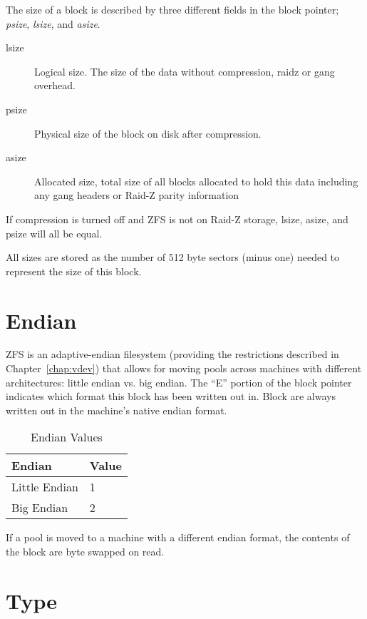 The size of a block is described by three different fields in the block pointer;
\emph{psize}, \emph{lsize}, and \emph{asize}.

\begin{description}
\item[lsize]
  Logical size. The size of the data without compression, raidz or gang overhead.

\item[psize]
  Physical size of the block on disk after compression.

\item[asize]
  Allocated size,
  total size of all blocks allocated to hold this data
  including any gang headers or Raid-Z parity information
\end{description}

If compression is turned off and ZFS is not on Raid-Z storage,
lsize, asize, and psize will all be equal.

All sizes are stored as the number of 512 byte sectors (minus one)
needed to represent the size of this block.

\section{Endian}

ZFS is an adaptive-endian filesystem
(providing the restrictions described in Chapter~\ref{chap:vdev})
that allows for moving pools across machines with different architectures:
little endian vs. big endian.
The “E” portion of the block pointer indicates
which format this block has been written out in.
Block are always written out in the machine's native endian format.

\begin{table}[ht]
  \caption{Endian Values}
  \label{tbl:endian_values}
  \centering
  \begin{tabular}{ll}
    \toprule
    \textbf{Endian} &     \textbf{Value}\\
    \midrule
    Little Endian & 1\\
    Big Endian & 2\\
    \bottomrule
  \end{tabular}
\end{table}

If a pool is moved to a machine with a different endian format,
the contents of the block are byte swapped on read.

\section{Type}

